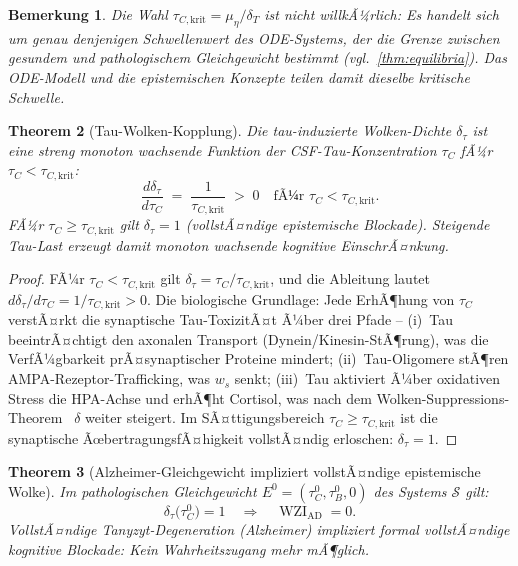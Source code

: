 ﻿\documentclass[12pt,a4paper]{article}
\newtheorem{theorem}{Theorem}[section]
\newtheorem{remark}[theorem]{Bemerkung}
\theoremstyle{definition}
\DeclareMathOperator{\WZI}{WZI}
\begin{document}
	\begin{remark}
		Die Wahl $\tau_{C,\mathrm{krit}} = \mu_\eta/\delta_T$ ist nicht willkÃ¼rlich: Es handelt
		sich um genau denjenigen Schwellenwert des ODE-Systems, der die Grenze zwischen
		gesundem und pathologischem Gleichgewicht bestimmt (vgl.\ \cref{thm:equilibria}). Das
		ODE-Modell und die epistemischen Konzepte teilen damit dieselbe kritische Schwelle.
	\end{remark}

	\begin{theorem}[Tau-Wolken-Kopplung]
		\label{thm:taucloud}
		Die tau-induzierte Wolken-Dichte $\delta_\tau$ ist eine streng monoton wachsende
		Funktion der CSF-Tau-Konzentration $\tau_C$ fÃ¼r $\tau_C < \tau_{C,\mathrm{krit}}$:
		\[
			\frac{d\delta_\tau}{d\tau_C} \;=\; \frac{1}{\tau_{C,\mathrm{krit}}} \;>\; 0
			\quad\text{fÃ¼r }\tau_C < \tau_{C,\mathrm{krit}}.
		\]
		FÃ¼r $\tau_C \geq \tau_{C,\mathrm{krit}}$ gilt $\delta_\tau = 1$ (vollstÃ¤ndige
		epistemische Blockade). Steigende Tau-Last erzeugt damit monoton wachsende
		kognitive EinschrÃ¤nkung.
	\end{theorem}

	\begin{proof}
		FÃ¼r $\tau_C < \tau_{C,\mathrm{krit}}$ gilt $\delta_\tau = \tau_C/\tau_{C,\mathrm{krit}}$,
		und die Ableitung lautet $d\delta_\tau/d\tau_C = 1/\tau_{C,\mathrm{krit}} > 0$.
		Die biologische Grundlage: Jede ErhÃ¶hung von $\tau_C$ verstÃ¤rkt die synaptische
		Tau-ToxizitÃ¤t Ã¼ber drei Pfade -- (i)~Tau beeintrÃ¤chtigt den axonalen Transport
		(Dynein/Kinesin-StÃ¶rung), was die VerfÃ¼gbarkeit prÃ¤synaptischer Proteine mindert;
		(ii)~Tau-Oligomere stÃ¶ren AMPA-Rezeptor-Trafficking, was $w_s$ senkt;
		(iii)~Tau aktiviert Ã¼ber oxidativen Stress die HPA-Achse und erhÃ¶ht Cortisol, was
		nach dem Wolken-Suppressions-Theorem~\cite{Epp2026brn} $\delta$ weiter steigert.
		Im SÃ¤ttigungsbereich $\tau_C \geq \tau_{C,\mathrm{krit}}$ ist die synaptische
		ÃœbertragungsfÃ¤higkeit vollstÃ¤ndig erloschen: $\delta_\tau = 1$.
	\end{proof}

	\begin{theorem}[Alzheimer-Gleichgewicht impliziert vollstÃ¤ndige epistemische Wolke]
		\label{thm:alz_wolke}
		Im pathologischen Gleichgewicht $E^0 = (\tau_C^0, \tau_B^0, 0)$ des Systems
		$\mathcal{S}$ gilt:
		\[
			\delta_\tau\bigl(\tau_C^0\bigr) = 1
			\quad\Rightarrow\quad
			\WZI_{\mathrm{AD}} = 0.
		\]
		VollstÃ¤ndige Tanyzyt-Degeneration (Alzheimer) impliziert formal vollstÃ¤ndige
		kognitive Blockade: Kein Wahrheitszugang mehr mÃ¶glich.
	\end{theorem}
\end{document}
